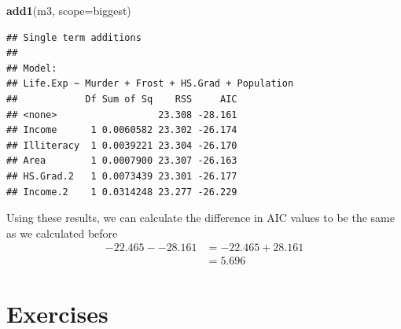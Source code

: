\documentclass[]{book}
\newenvironment{Shaded}{\begin{snugshade}}{\end{snugshade}}
\newcommand{\KeywordTok}[1]{\textcolor[rgb]{0.13,0.29,0.53}{\textbf{{#1}}}}
\newcommand{\DataTypeTok}[1]{\textcolor[rgb]{0.13,0.29,0.53}{{#1}}}
\newcommand{\NormalTok}[1]{{#1}}
\theoremstyle{definition}
\theoremstyle{definition}
\theoremstyle{remark}
\begin{document}
\begin{Shaded}
\begin{Highlighting}[]
\KeywordTok{add1}\NormalTok{(m3, }\DataTypeTok{scope=}\NormalTok{biggest)}
\end{Highlighting}
\end{Shaded}

\begin{verbatim}
## Single term additions
## 
## Model:
## Life.Exp ~ Murder + Frost + HS.Grad + Population
##            Df Sum of Sq    RSS     AIC
## <none>                  23.308 -28.161
## Income      1 0.0060582 23.302 -26.174
## Illiteracy  1 0.0039221 23.304 -26.170
## Area        1 0.0007900 23.307 -26.163
## HS.Grad.2   1 0.0073439 23.301 -26.177
## Income.2    1 0.0314248 23.277 -26.229
\end{verbatim}

Using these results, we can calculate the difference in AIC values to be
the same as we calculated before \[\begin{aligned}
-22.465--28.161 &=  -22.465+28.161 \\
    &=  5.696
    \end{aligned}\]

\section{Exercises}\label{exercises-6}
\end{document}
